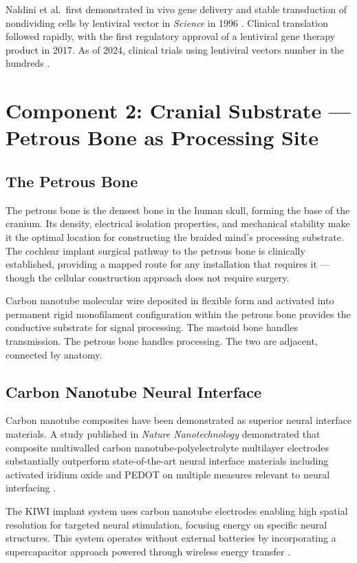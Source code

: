 \documentclass[12pt]{article}
\begin{document}
Naldini et al.\ first demonstrated in vivo gene delivery and stable transduction of nondividing cells by lentiviral vector in \textit{Science} in 1996 \cite{naldini_1996}. Clinical translation followed rapidly, with the first regulatory approval of a lentiviral gene therapy product in 2017. As of 2024, clinical trials using lentiviral vectors number in the hundreds \cite{era_gene_therapy_2025}.

\section{Component 2: Cranial Substrate --- Petrous Bone as Processing Site}

\subsection{The Petrous Bone}

The petrous bone is the densest bone in the human skull, forming the base of the cranium. Its density, electrical isolation properties, and mechanical stability make it the optimal location for constructing the braided mind's processing substrate. The cochlear implant surgical pathway to the petrous bone is clinically established, providing a mapped route for any installation that requires it --- though the cellular construction approach does not require surgery.

Carbon nanotube molecular wire deposited in flexible form and activated into permanent rigid monofilament configuration within the petrous bone provides the conductive substrate for signal processing. The mastoid bone handles transmission. The petrous bone handles processing. The two are adjacent, connected by anatomy.

\subsection{Carbon Nanotube Neural Interface}

Carbon nanotube composites have been demonstrated as superior neural interface materials. A study published in \textit{Nature Nanotechnology} demonstrated that composite multiwalled carbon nanotube-polyelectrolyte multilayer electrodes substantially outperform state-of-the-art neural interface materials including activated iridium oxide and PEDOT on multiple measures relevant to neural interfacing \cite{cnt_neural_2009}.

The KIWI implant system uses carbon nanotube electrodes enabling high spatial resolution for targeted neural stimulation, focusing energy on specific neural structures. This system operates without external batteries by incorporating a supercapacitor approach powered through wireless energy transfer \cite{cnt_neural_implant}.
\end{document}
